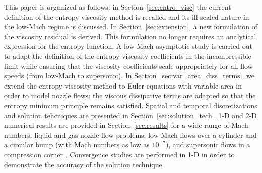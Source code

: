 \documentclass[review,10pt]{elsarticle}
\renewcommand{\div}{\vec{\nabla}\! \cdot \!}
\newcommand{\grad}{\vec{\nabla}}
\newcommand{\eqt}[1]{Eq.~(\ref{#1})}                     %
\newcommand{\sct}[1]{Section~\ref{#1}}                   %
\newcommand{\tcr}[1]{\textcolor{red}{#1}}
\begin{document}
This paper is organized as follows: in \sct{sec:entro_visc} the current definition of the entropy viscosity method is recalled and 
its ill-scaled nature in the low-Mach regime is discussed. 
In \sct{sec:extension}, a new formulation of the viscosity residual is derived. This formulation no longer requires an analytical expression 
for the entropy function. A low-Mach asymptotic study is carried out to adapt the definition of the entropy viscosity coefficients 
in the incompressible limit while ensuring that the viscosity coefficients scale appropriately for all flow speeds (from low-Mach to supersonic).
%
In  \sct{sec:var_area_diss_terms}, we extend the entropy viscosity method to Euler equations with variable area in order to model nozzle flows: 
the viscous dissipative terms are adapted so that the entropy minimum principle remains satisfied.
Spatial and temporal discretizations and solution tehcniques are presented in \sct{sec:solution_tech}.
 1-D and 2-D numerical results 
are provided in \sct{sec:results} for a wide range of Mach numbers: liquid and gas nozzle flow problems, 
low-Mach flows over a cylinder and a circular bump (with Mach numbers as low as $10^{-7}$), and supersonic flows 
in a compression corner \cite{CompressionCorner}. 
Convergence studies are performed in 1-D in order to demonstrate the accuracy of the solution technique. 


\end{document}
